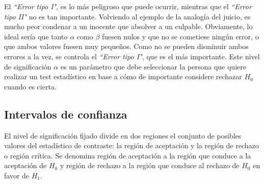 El \textit{``Error tipo I"}, es lo más peligroso que puede ocurrir, mientras que el \textit{``Error tipo II"}
no es tan importante. Volviendo al ejemplo de la analogía del juicio, es mucho peor condenar a un inocente que
absolver a un culpable. Obviamente, lo ideal sería que tanto $\alpha$ como $\beta$ fuesen nulos y que no se
cometiese ningún error, o que ambos valores fuesen muy pequeños. Como no se pueden disminuir ambos errores a la
vez, se controla el \textit{``Error tipo I"}, que es el más importante. Este nivel de significación $\alpha$
es un parámetro que debe seleccionar la persona que quiere realizar un test estadístico en base a cómo de
importante considere rechazar $H_0$ cuando es cierta.


\subsection{Intervalos de confianza}
El nivel de significación fijado divide en dos regiones el conjunto de posibles valores del estadístico de
contraste: la región de aceptación y la región de rechazo o región crítica. Se denomina región de aceptación
a la región que conduce a la aceptación de $H_0$ y región de rechazo a la región que conduce al rechazo de $H_0$
en favor de $H_1$.

